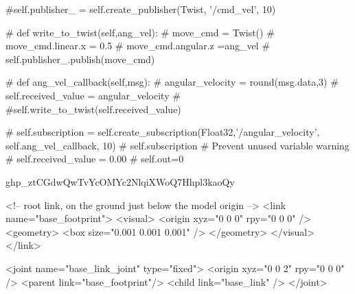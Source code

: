#self.publisher_ = self.create_publisher(Twist, '/cmd_vel', 10)

# def write_to_twist(self,ang_vel):
#     move_cmd = Twist()
#     move_cmd.linear.x = 0.5
#     move_cmd.angular.z =ang_vel
#     self.publisher_.publish(move_cmd)

# def ang_vel_callback(self,msg):
#     angular_velocity = round(msg.data,3)
#     self.received_value = angular_velocity
#     #self.write_to_twist(self.received_value)
    
# self.subscription = self.create_subscription(Float32,'/angular_velocity', self.ang_vel_callback, 10)
# self.subscription  # Prevent unused variable warning
# self.received_value = 0.00
# self.out=0 


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


<!-- root link, on the ground just below the model origin -->
<link name="base_footprint">
 <visual>
    <origin xyz="0 0 0" rpy="0 0 0" />
    <geometry>
      <box size="0.001 0.001 0.001" />
    </geometry>
  </visual>
</link>

<joint name="base_link_joint" type="fixed">
  <origin xyz="0 0 2" rpy="0 0 0" />
  <parent link="base_footprint"/>
  <child link="base_link" />
</joint>